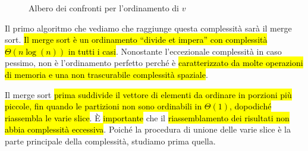 \documentclass[a4paper,11pt,twoside]{article}
\theoremstyle{plain}
\theoremstyle{definition}
\theoremstyle{remark}
\begin{document}
\begin{figure}[htb]
  \centering
  \caption{Albero dei confronti per l'ordinamento di $v$}%
  \label{fig:albero-confronti}
\end{figure}

Il primo algoritmo che vediamo che raggiunge questa complessità sarà il merge
sort. \hl{Il merge sort è un ordinamento ``divide et impera'' con complessità
$\Theta(n\log(n))$ in tutti i casi}. Nonostante l'eccezionale complessità in
caso pessimo, non è l'ordinamento perfetto perché è \hl{caratterizzato da molte
operazioni di memoria e una non trascurabile complessità spaziale}.

Il merge sort \hl{prima suddivide il vettore di elementi da ordinare in porzioni più
piccole, fin quando le partizioni non sono ordinabili in $\Theta(1)$, dopodiché
riassembla le varie slice}. È \hl{importante} che il \hl{riassemblamento dei risultati non
abbia complessità eccessiva}. Poiché la procedura di unione delle varie slice
è la parte principale della complessità, studiamo prima quella.
\end{document}
